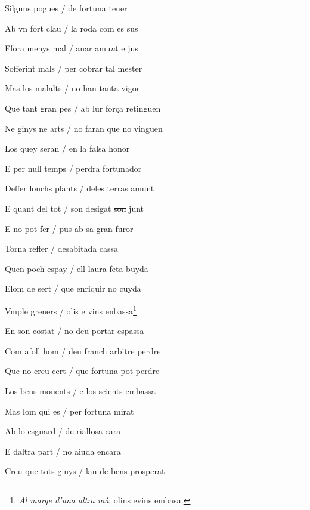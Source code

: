 \documentclass[12pt]{article}
\begin{document}
\begin{estrofa}

 Silguns pogues / de fortuna tener

 Ab vn fort clau / la roda com es sus

 Ffora menys mal / anar amu\textit{n}t e jus

 Sofferint mals / per cobrar tal mester

 Mas los malalts / no han tanta vigor

 Que tant gran pes / ab lur for\c{c}a retinguen

 Ne ginys ne arts / no faran que no vinguen

 Los quey seran / en la falsa honor

\end{estrofa}



\begin{estrofa}

 E per null temps / perdra fortunador

 Deffer lonchs plants / deles terras amunt

 E quant del tot / son desigat \sout{son}  junt

 E no pot fer / pus ab sa gran furor

 Torna reffer / desabitada cassa

 Quen poch espay / ell laura feta buyda

 Elom de sert / que enriquir no cuyda

 Vmple greners / olis e vins enbassa\footnote{\textit{Al marge d'una altra
m\`{a}}: olins evins embasa.}

\end{estrofa}



\begin{estrofa}

 En son costat / no deu portar espassa

 Com afoll hom / deu franch arbitre perdre

 Que no creu cert / que fortuna pot perdre

 Los bens mouents / e los scients embassa

 Mas lom qui es / per fortuna mirat

 Ab lo esguard / de riallosa cara

 E daltra part / no aiuda encara

 Creu que tots ginys / lan de bens prosperat

\end{estrofa}
\end{document}
